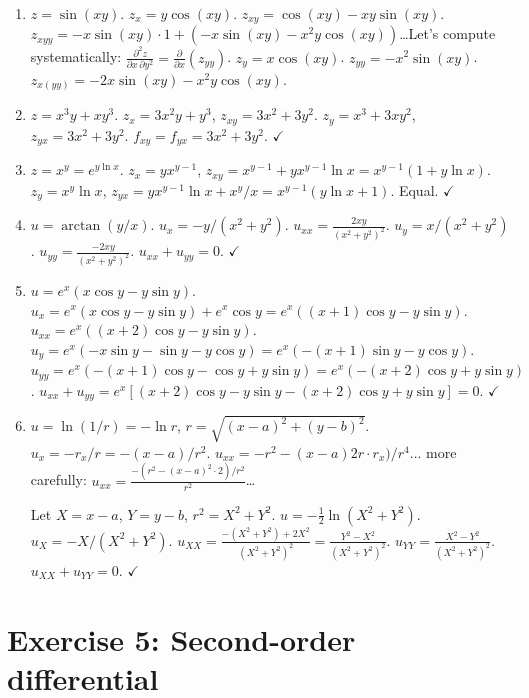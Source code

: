 \documentclass[12pt,a4paper]{article}
\begin{document}
\begin{enumerate}[leftmargin=*, label=(\alph*)]

\item $z=\sin(xy)$. $z_x=y\cos(xy)$. $z_{xy}=\cos(xy)-xy\sin(xy)$.
$z_{xyy}=-x\sin(xy)\cdot 1+(-x\sin(xy)-x^2y\cos(xy))$\ldots Let's compute systematically:
$\frac{\partial^2 z}{\partial x\,\partial y^2}=\frac{\partial}{\partial x}(z_{yy})$.
$z_y=x\cos(xy)$. $z_{yy}=-x^2\sin(xy)$. $z_{x(yy)}=-2x\sin(xy)-x^2y\cos(xy)$.

\item $z=x^3y+xy^3$. $z_x=3x^2y+y^3$, $z_{xy}=3x^2+3y^2$.
$z_y=x^3+3xy^2$, $z_{yx}=3x^2+3y^2$. $f_{xy}=f_{yx}=3x^2+3y^2$. $\checkmark$

\item $z=x^y=e^{y\ln x}$. $z_x=yx^{y-1}$, $z_{xy}=x^{y-1}+y x^{y-1}\ln x=x^{y-1}(1+y\ln x)$.
$z_y=x^y\ln x$, $z_{yx}=yx^{y-1}\ln x+x^y/x=x^{y-1}(y\ln x+1)$. Equal. $\checkmark$

\item $u=\arctan(y/x)$. $u_x=-y/(x^2+y^2)$.
$u_{xx}=\frac{2xy}{(x^2+y^2)^2}$.
$u_y=x/(x^2+y^2)$.
$u_{yy}=\frac{-2xy}{(x^2+y^2)^2}$.
$u_{xx}+u_{yy}=0$. $\checkmark$

\item $u=e^x(x\cos y-y\sin y)$. $u_x=e^x(x\cos y-y\sin y)+e^x\cos y=e^x((x+1)\cos y-y\sin y)$.
$u_{xx}=e^x((x+2)\cos y-y\sin y)$.
$u_y=e^x(-x\sin y-\sin y-y\cos y)=e^x(-(x+1)\sin y-y\cos y)$.
$u_{yy}=e^x(-(x+1)\cos y-\cos y+y\sin y)=e^x(-(x+2)\cos y+y\sin y)$.
$u_{xx}+u_{yy}=e^x[(x+2)\cos y-y\sin y-(x+2)\cos y+y\sin y]=0$. $\checkmark$

\item $u=\ln(1/r)=-\ln r$, $r=\sqrt{(x-a)^2+(y-b)^2}$.
$u_x=-r_x/r=-(x-a)/r^2$. $u_{xx}=-r^2-(x-a)2r\cdot r_x)/r^4$... more carefully:
$u_{xx}=\frac{-(r^2-(x-a)^2\cdot 2)/r^2}{r^2}$\ldots

Let $X=x-a$, $Y=y-b$, $r^2=X^2+Y^2$. $u=-\frac{1}{2}\ln(X^2+Y^2)$.
$u_X=-X/(X^2+Y^2)$. $u_{XX}=\frac{-(X^2+Y^2)+2X^2}{(X^2+Y^2)^2}=\frac{Y^2-X^2}{(X^2+Y^2)^2}$.
$u_{YY}=\frac{X^2-Y^2}{(X^2+Y^2)^2}$.
$u_{XX}+u_{YY}=0$. $\checkmark$

\end{enumerate}

\section*{Exercise 5: Second-order differential}
\end{document}
